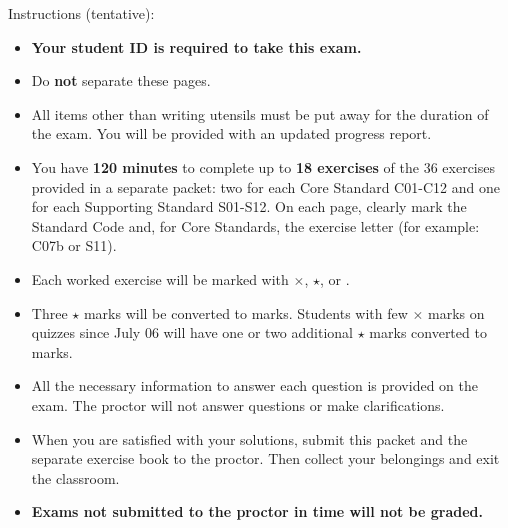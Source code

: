 \documentclass[12pt]{article}
\newcommand{\<}{\left\langle}
\renewcommand{\>}{\right\rangle}
\begin{document}

\vspace{1em}

Instructions (tentative):

\begin{itemize}
  \item \textbf{Your student ID is required to take this exam.}
  \item Do \textbf{not} separate these pages.
  \item All items other than writing utensils must be put away for the duration
        of the exam. You will be provided with an updated progress report.
  \item You have \textbf{120 minutes} to complete up to \textbf{18 exercises}
        of the 36 exercises provided in a separate packet:
        two for each Core Standard C01-C12 and one for each Supporting Standard
        S01-S12. On each page, clearly mark the Standard Code and, for
        Core Standards, the exercise letter (for example: C07b or S11).
  \item Each worked exercise will be marked with \(\times\), \(\star\), or
        \checkmark{}.
  \item Three \(\star\) marks will be converted to \checkmark{} marks.
        Students with few \(\times\) marks on quizzes since July 06
        will have one or two additional \(\star\) marks converted to
        \checkmark{} marks.
  \item All the necessary information to answer each question is provided
        on the exam.
        The proctor will not answer questions or make clarifications.
  \item When you are satisfied with your solutions, submit this packet and
        the separate exercise book to
        the proctor. Then collect your belongings and exit the classroom.
  \item \textbf{Exams not submitted to the proctor in time will not be
        graded.}
\end{itemize}
\end{document}
